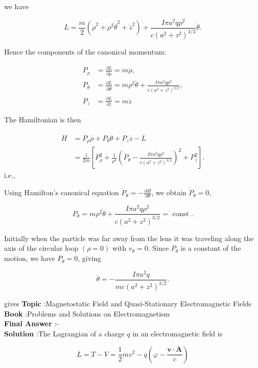 \documentclass[10pt]{article}
\begin{document}
we have

$$
L=\frac{m}{2}\left(\dot{\rho}^{2}+\rho^{2} \dot{\theta}^{2}+\dot{z}^{2}\right)+\frac{I \pi a^{2} q \rho^{2}}{c\left(a^{2}+z^{2}\right)^{3 / 2}} \dot{\theta} .
$$

Hence the components of the canonical momentum:

$$
\begin{aligned}
P_{\rho} &=\frac{\partial L}{\partial \dot{\rho}}=m \dot{\rho}, \\
P_{\theta} &=\frac{\partial L}{\partial \dot{\theta}}=m \rho^{2} \dot{\theta}+\frac{I \pi a^{2} q p^{2}}{c\left(a^{2}+z^{2}\right)^{3 / 2}}, \\
P_{z} &=\frac{\partial L}{\partial \dot{z}}=m \dot{z}
\end{aligned}
$$

The Hamiltonian is then

$$
\begin{aligned}
H &=P_{\rho} \dot{\rho}+P_{\theta} \dot{\theta}+P_{z} \dot{z}-L \\
&=\frac{1}{2 m}\left[P_{\rho}^{2}+\frac{1}{\rho^{2}}\left(P_{\theta}-\frac{I \pi a^{2} q \rho^{2}}{c\left(a^{2}+z^{2}\right)^{3 / 2}}\right)^{2}+P_{z}^{2}\right] .
\end{aligned}
$$
i.e.,

 Using Hamilton's canonical equation $\dot{P}_{\theta}=-\frac{\partial H}{\partial \theta}$, we obtain $\dot{P}_{\theta}=0$,

$$
P_{\theta}=m \rho^{2} \dot{\theta}+\frac{I \pi a^{2} q \rho^{2}}{c\left(a^{2}+z^{2}\right)^{3 / 2}}=\text { const } .
$$

Initially when the particle was far away from the lens it was traveling along the axis of the circular loop $(\rho=0)$ with $v_{\theta}=0$. Since $P_{\theta}$ is a constant of the motion, we have $P_{\theta}=0$, giving

$$
\dot{\theta}=-\frac{I \pi a^{2} q}{m c\left(a^{2}+z^{2}\right)^{3 / 2}} .
$$

gives
\textbf{Topic} :Magnetostatic Field and Quasi-Stationary Electromagnetic Fields\\
\textbf{Book} :Problems and Solutions on Electromagnetism\\
\textbf{Final Answer} :-\\


\textbf{Solution} :The Lagrangian of a charge $q$ in an electromagnetic field is

$$
L=T-V=\frac{1}{2} m v^{2}-q\left(\varphi-\frac{\mathbf{v} \cdot \mathbf{A}}{c}\right)
$$
\end{document}
